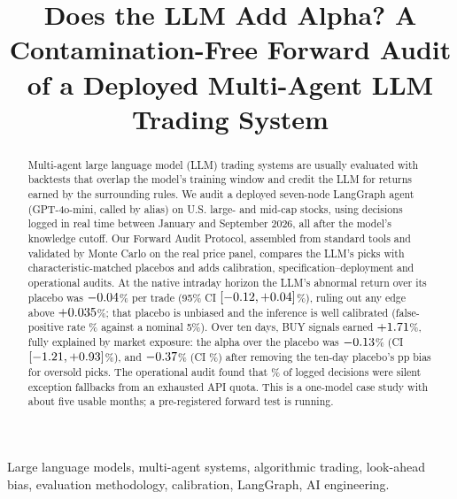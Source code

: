 \documentclass[conference]{IEEEtran}
\newcommand{\pct}[1]{$#1$\%}
\begin{document}
\title{Does the LLM Add Alpha? A Contamination-Free Forward Audit of a Deployed Multi-Agent LLM Trading System}

\author{
}

\maketitle

\begin{abstract}
Multi-agent large language model (LLM) trading systems are usually evaluated with backtests that overlap the model's training window and credit the LLM for returns earned by the surrounding rules. We audit a deployed seven-node LangGraph agent (GPT-4o-mini, called by alias) on U.S. large- and mid-cap stocks, using \nRaw{} decisions logged in real time between January and September 2026, all after the model's knowledge cutoff. Our Forward Audit Protocol, assembled from standard tools and validated by Monte Carlo on the real price panel, compares the LLM's picks with characteristic-matched placebos and adds calibration, specification--deployment and operational audits. At the native intraday horizon the LLM's abnormal return over its placebo was \pct{\iAlpha} per trade (95\% CI \pct{\iAlphaCI}), ruling out any edge above \pct{\mdeUpperIntra}; that placebo is unbiased and the inference is well calibrated (false-positive rate \ipSizeBoot\% against a nominal 5\%). Over ten days, \nBuy{} BUY signals earned \pct{\mBuyRawten}, fully explained by market exposure: the alpha over the placebo was \pct{\mBuyMinusMatch} (CI \pct{\mBuyMinusMatchCI}), and \pct{\hSixEst} (CI \hSixCI\%) after removing the ten-day placebo's \powBias{} pp bias for oversold picks. The operational audit found that \opFallbackPct\% of logged decisions were silent exception fallbacks from an exhausted API quota. This is a one-model case study with about five usable months; a pre-registered forward test is running.
\end{abstract}

\begin{IEEEkeywords}
Large language models, multi-agent systems, algorithmic trading, look-ahead bias, evaluation methodology, calibration, LangGraph, AI engineering.
\end{IEEEkeywords}

\end{document}
